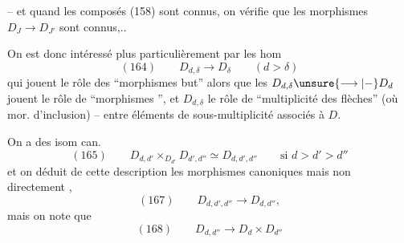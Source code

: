 -- et quand les composés (158) sont connus, on vérifie que les morphismes $D_J\longrightarrow D_{J'}$ sont connus,..

On est donc intéressé plus particulièrement par les hom
\[
(164)\qquad D_{d,\delta}\longrightarrow D_\delta\qquad(d>\delta)
\]
qui jouent le rôle des ``morphismes but'' alors que les $D_{d,\delta}\unsure{\longrightarrow|-}D_d$ jouent le rôle de ``morphismes '', et $D_{d,\delta}$ le rôle de ``multiplicité des flèches'' (où mor. d'inclusion) -- entre éléments de sous-multiplicité  associés à $D$.

On a des isom can.
\[
(165)\qquad D_{d,d'}\times_{D_{d'}}D_{d',d''}\simeq D_{d,d',d''}\qquad\text{si }d>d'>d''
\]
et on  déduit de cette description les morphismes canoniques
mais non directement ,
\[
(167)\qquad D_{d,d',d''}\longrightarrow D_{d,d''},
\]
mais on note que
\[
(168)\qquad D_{d,d''}\longrightarrow D_d\times D_{d''}
\]

